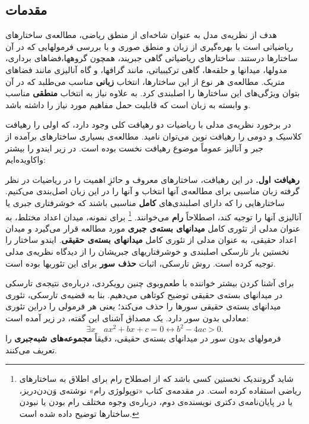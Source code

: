 \documentclass[12pt,a4paper]{report}
\theoremstyle{colorhead}
\begin{document}
\subsection{مقدمات}
هدف از
نظریه‌ی مدل 
به عنوان شاخه‌ای
از منطق ریاضی، مطالعه‌ی ساختارهای ریاضیاتی
است با بهره‌گیری از زبان و منطق صوری
 و با بررسی فرمولهایی که در آن ساختارها درستند. ساختارهای ریاضیاتی گاهی جبریند، همچون گروهها،‌فضاهای برداری، مدولها، میدانها و حلقه‌ها، گاهی
 ترکیبیاتی، مانند گرافها،‌ و گاه آنالیزی مانند فضاهای متریک. مطالعه‌ی هر نوع از این ساختارها، انتخاب
\textbf{ زبانی }
مناسب می‌طلبد که در آن بتوان ویژگی‌های این ساختارها را اصلبندی کرد. 
به علاوه نیاز به انتخاب 
\textbf{منطقی}
مناسب و وابسته به زبان است
 که 
قابلیت حمل مفاهیم مورد نیاز را داشته باشد.
\par 
در برخورد نظریه‌ی مدلی با ریاضیات دو رهیافت کلی وجود دارد، که اولی را  رهیافت کلاسیک و دومی را رهیافت نوین 
می‌توان
نامید. مطالعه‌ی بسیاری ساختارهای برآمده از جبر و آنالیز عموماً موضوع رهیافت نخست بوده است. در زیر ایندو را بیشتر واکاویده‌ایم:
\par \noindent
\textbf{رهیافت اول. }
در این رهیافت، ساختارهای معروف و حائزِ اهمیت را در ریاضیات در نظر گرفته زبان مناسبی برای مطالعه‌ی آنها انتخاب و آنها را در این زبان اصل‌بندی می‌کنیم. 
ساختارهایی را که دارای اصلبندی‌های \textbf{کامل}
مناسبی باشند که خوشرفتاری جبری یا آنالیزی آنها را توجیه کند، اصطلاحاً 
\textbf{رام}
می‌خوانند. 
\footnote{شاید 
گروتندیک نخستین کسی باشد که 
از اصطلاح رام
برای اطلاق به ساختارهای ریاضی استفاده کرده است. 
در مقدمه‌ی کتاب «توپولوژی رام» نوشته‌ی وَن‌دن‌دریز، یا در پایان‌نامه‌ی دکتری نویسنده‌ی دوم، درباره‌ی 
وجوه مختلف
رام بودن یا نبودن ساختارها توضیح داده شده است. 
}
برای نمونه، میدان اعداد مختلط، به عنوان مدلی از تئوری‌ کامل 
\textbf{میدانهای بسته‌ی جبری}
مورد مطالعه قرار می‌گیرد و میدان اعداد حقیقی، به عنوان مدلی از تئوری کامل
\textbf{میدانهای بسته‌ی حقیقی}.
ایندو ساختار را نخستین بار تارسکی اصلبندی و خوشرفتاریهای جبریشان را از دیدگاه نظریه‌ی مدلی توجیه کرده است. روش تارسکی، اثبات 
\textbf{حذف سور}
برای این تئوریها بوده است. 
\par 
برای آشنا کردن بیشتر خواننده با طعم‌وبوی چنین رویکردی، درباره‌ی 
نتیجه‌ی
تارسکی در
میدانهای بسته‌ی حقیقی توضیح کوتاهی می‌دهیم. بنا به قضیه‌ی تارسکی، تئوری میدانهای بسته‌ی حقیقی سورها را حذف می‌کند؛ 
یعنی هر فرمولی را دراین تئوری معادلی بدون سور دارد. یک مصداق آشنای این گفته، در زیر آمده است:
\[
\exists x\quad ax^2+bx+c=0\leftrightarrow b^2-4ac>0.
\]
فرمولهای بدون سور در میدانهای بسته‌ی حقیقی، دقیقاً 
\textbf{مجموعه‌های شبه‌جبری }
را تعریف می‌کنند.
\end{document}
